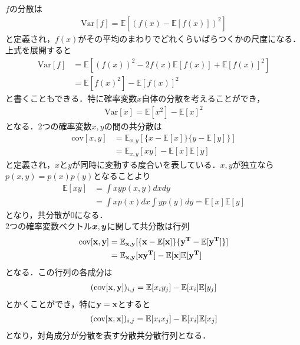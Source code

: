\documentclass[a4j,11pt]{jsarticle}
\newcommand{\Var}{\mbox{Var}}
\newcommand{\cov}{\mbox{cov}}
\newcommand{\bx}{\mbox{\boldmath {$x$}}}
\newcommand{\by}{\mbox{\boldmath {$y$}}}
\newcommand{\E}{\mathbb{E}}
\numberwithin{equation}{section}
\begin{document}
$f$の分散は
\begin{align}
\Var[f] = \mathbb{E}\left[(f(x) - \mathbb{E}[f(x)])^2\right]
\end{align}
と定義され，$f(x)$がその平均のまわりでどれくらいばらつくかの尺度になる．上式を展開すると
\begin{equation}
\begin{split}
\Var[f] &= \mathbb{E}\left[(f(x))^2  - 2f(x) \mathbb{E}[f(x)] +\mathbb{E}[f(x)] ^2\right]\\
&=\mathbb{E}[f(x)^2] - \mathbb{E}[f(x)] ^2
\end{split}
\end{equation}
と書くこともできる．特に確率変数$x$自体の分散を考えることができ，
\begin{align}
\Var[x]  =\mathbb{E}[x^2] - \mathbb{E}[x]^2
\end{align}
となる．2つの確率変数$x,y$の間の共分散は
\begin{equation}
\begin{split}
\cov[x,y]& = \E_{x,y}[\{x - \E[x]\}\{y - \E[y]\}]\\
&= \E_{x,y}[xy] - \E[x]\E[y]
\end{split}
\end{equation}
と定義され，$x$と$y$が同時に変動する度合いを表している．$x,y$が独立なら$p(x,y) = p(x)p(y)$となることより
\begin{align*}
\E[xy] &= \int xy p(x,y)dxdy\\
&=\int xp(x)dx \int y p(y) dy= \E[x]\E[y]
\end{align*}
となり，共分散が$0$になる．\\
2つの確率変数ベクトル$\bx,\by$に関して共分散は行列
\begin{equation}
\begin{split}
\cov[\bf x,\bf y] &= \E_{\bf x,\bf y}[\{\bf x - \E[\bf x]\}\{\bf y^T - \E[\bf y^T]\}]\\
&=\E_{\bf x,\bf y}[\bf x\bf y^T] - \E[\bf x]\E[\bf y^T]
\end{split}
\end{equation}
となる．この行列の各成分は
\begin{align*}
  (\cov[{\bf x,\bf y}] )_{i,j} = \E[x_i y_j] - \E[x_i]\E[y_j]
\end{align*}
とかくことができ，特に$\bf y = \bf x$とすると
\begin{align*}
  (\cov[{\bf x,\bf x}] )_{i,j} = \E[x_i x_j] - \E[x_i]\E[x_j]
\end{align*}
となり，対角成分が分散を表す分散共分散行列となる．\\
\end{document}

